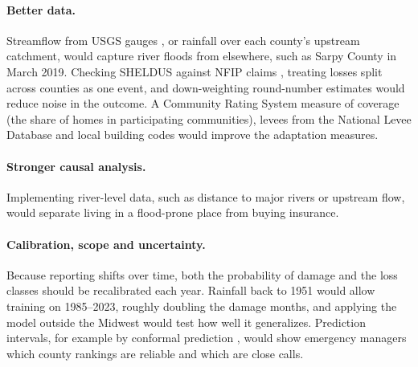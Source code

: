 \documentclass[10pt,twocolumn]{article}
\begin{document}
\paragraph{Better data.} Streamflow from USGS gauges \citep{usgs2026} , or rainfall over each county's upstream
catchment, would capture river floods from elsewhere, such as Sarpy County in March 2019. Checking
SHELDUS against NFIP claims \citep{fema2026}, treating losses split across counties as one event, and down-weighting
round-number estimates would reduce noise in the outcome. A Community Rating System measure of
coverage (the share of homes in participating communities), levees from the National Levee
Database \citep{usace2026} and local building codes would improve the adaptation measures.

\paragraph{Stronger causal analysis.} Implementing river-level data, such as distance to major rivers or upstream flow, would separate living in a flood-prone place from buying insurance.

\paragraph{Calibration, scope and uncertainty.} Because reporting shifts over time, both the
probability of damage and the loss classes should be recalibrated each year. Rainfall back to 1951 \citep{durre2022}
would allow training on 1985--2023, roughly doubling the damage months, and applying the model
outside the Midwest would test how well it generalizes. Prediction intervals, for example by
conformal prediction \citep{angelopoulos2021}, would show emergency managers which county rankings are reliable and which
are close calls.
\end{document}
